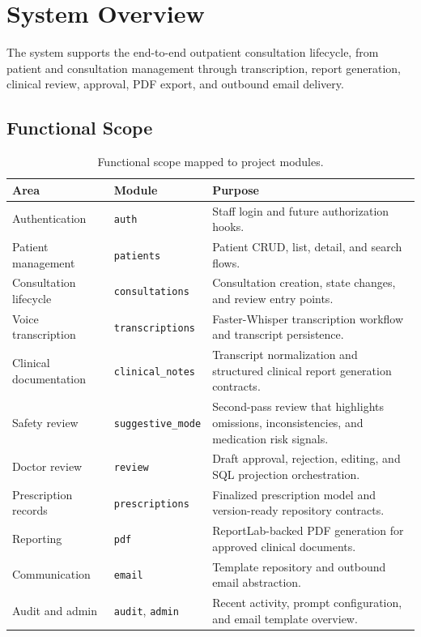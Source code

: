 \section{System Overview}

The system supports the end-to-end outpatient consultation lifecycle, from patient and consultation management through transcription, report generation, clinical review, approval, PDF export, and outbound email delivery.

\subsection{Functional Scope}

\begin{longtable}{@{}L{0.24\textwidth}L{0.28\textwidth}Y@{}}
\caption{Functional scope mapped to project modules.}\\
\toprule
\textbf{Area} & \textbf{Module} & \textbf{Purpose} \\
\midrule
Authentication & \texttt{auth} & Staff login and future authorization hooks. \\
Patient management & \texttt{patients} & Patient CRUD, list, detail, and search flows. \\
Consultation lifecycle & \texttt{consultations} & Consultation creation, state changes, and review entry points. \\
Voice transcription & \texttt{transcriptions} & Faster-Whisper transcription workflow and transcript persistence. \\
Clinical documentation & \texttt{clinical\_notes} & Transcript normalization and structured clinical report generation contracts. \\
Safety review & \texttt{suggestive\_mode} & Second-pass review that highlights omissions, inconsistencies, and medication risk signals. \\
Doctor review & \texttt{review} & Draft approval, rejection, editing, and SQL projection orchestration. \\
Prescription records & \texttt{prescriptions} & Finalized prescription model and version-ready repository contracts. \\
Reporting & \texttt{pdf} & ReportLab-backed PDF generation for approved clinical documents. \\
Communication & \texttt{email} & Template repository and outbound email abstraction. \\
Audit and admin & \texttt{audit}, \texttt{admin} & Recent activity, prompt configuration, and email template overview. \\
\bottomrule
\end{longtable}

